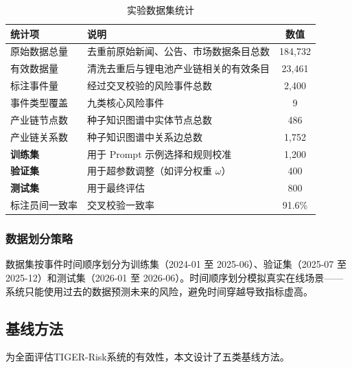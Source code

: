 \documentclass[12pt,a4paper]{article}
\newcommand{\projectshort}{TIGER-Risk}
\begin{document}
\begin{table}[H]
\centering
\footnotesize
\caption{实验数据集统计}
\label{tab:dataset-stats}
\begin{tabularx}{0.95\linewidth}{l X c}
\toprule
\textbf{统计项} & \textbf{说明} & \textbf{数值} \\
\midrule
原始数据总量 & 去重前原始新闻、公告、市场数据条目总数 & 184,732 \\
有效数据量 & 清洗去重后与锂电池产业链相关的有效条目 & 23,461 \\
标注事件量 & 经过交叉校验的风险事件总数 & 2,400 \\
事件类型覆盖 & 九类核心风险事件 & 9 \\
产业链节点数 & 种子知识图谱中实体节点总数 & 486 \\
产业链关系数 & 种子知识图谱中关系边总数 & 1,752 \\
\textbf{训练集} & 用于 Prompt 示例选择和规则校准 & 1,200 \\
\textbf{验证集} & 用于超参数调整（如评分权重 $\omega$） & 400 \\
\textbf{测试集} & 用于最终评估 & 800 \\
标注员间一致率 & 交叉校验一致率 & 91.6\% \\
\bottomrule
\end{tabularx}
\end{table}

\subsubsection{数据划分策略}

数据集按事件时间顺序划分为训练集（2024-01 至 2025-06）、验证集（2025-07 至 2025-12）和测试集（2026-01 至 2026-06）。时间顺序划分模拟真实在线场景——系统只能使用过去的数据预测未来的风险，避免时间穿越导致指标虚高。

\subsection{基线方法}
\label{sec:exp-baseline}

为全面评估\projectshort 系统的有效性，本文设计了五类基线方法。
\end{document}
